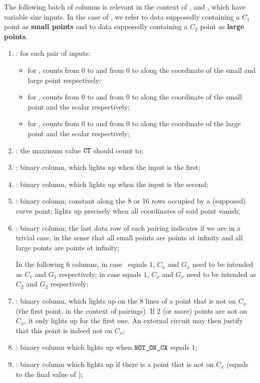 The following batch of columns is relevant in the context of ,  and , which have variable size inputs.
In the case of , we refer to data supposedly containing a $C_1$ point as \textbf{small points} and to data supposedly containing a $C_2$ point as \textbf{large points}.
\begin{enumerate}[resume]
      \item \ct:
            for each pair of inputs:
            \begin{itemize}
                  \item for , counts from 0 to \ctMaxSmallPoint{} and from 0 to \ctMaxLargePoint{} along the coordinate of the small and large point respectively;
                  \item for , counts from 0 to \ctMaxSmallPoint{} and from 0 to \ctMaxScalar{} along the coordinate of the small point and the scalar respectively;
                  \item for , counts from 0 to \ctMaxLargePoint{} and from 0 to \ctMaxScalar{} along the coordinate of the large point and the scalar respectively;
            \end{itemize}
      \item \maxCt:
            the maximum value $\texttt{CT}$ should count to;
      \item \isFirstInput:
            binary column, which lights up when the input is the first;
      \item \isSecondInput:
            binary column, which lights up when the input is the second;
      \item \isInfinity:
            binary column;
            constant along the 8 or 16 rows occupied by a (supposed) curve point;
            lights up precisely when all coordinates of said point vanish;
      \item \both{\trivialPairing}: binary column; the last data row of each pairing indicates if we are in a trivial case, in the sense that all small points are points at infinity and all large points are points at infinity;
      
      In the following 6 columns, in case \isFirstInput{} equals $1$, $C_x$ and $G_x$ need to be intended as $C_1$ and $G_1$ respectively; in case \isSecondInput{} equals $1$, $C_x$ and $G_x$ need to be intended as $C_2$ and $G_2$ respectively:

      \item \notOnCX{} \blsPrediction{}: binary column, which lights up on the 8 lines of a point that is not on $C_x$ (the first point, in the context of pairings). If 2 (or more) points are not on $C_x$, it only lights up for the first one. An external circuit may then justify that this point is indeed not on $C_x$;     
      \item \notOnCXAcc: binary column which lights up when $\texttt{NOT\_ON\_CX}$ equals $1$;  
      \item \notOnCXAccMax: binary column which lights up if there is a point that is not on $C_x$ (equals to the final value of \notOnCXAcc);


\end{enumerate}
